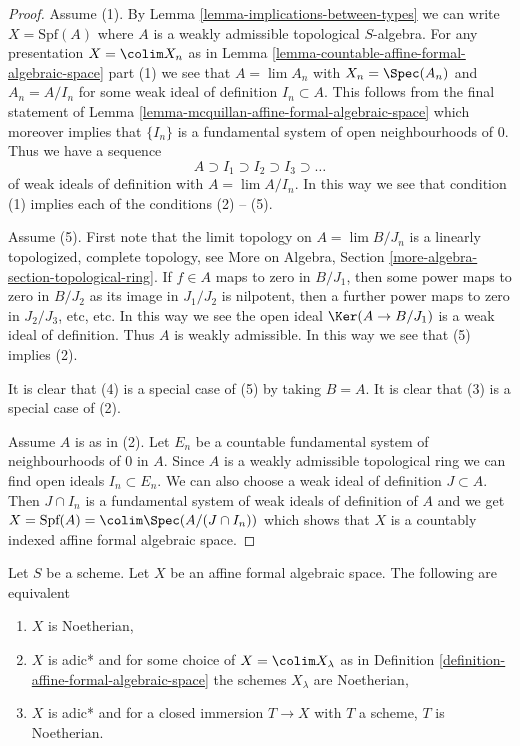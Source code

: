 \begin{proof}
Assume (1). By Lemma \ref{lemma-implications-between-types}
we can write $X = \text{Spf}(A)$ where $A$ is a weakly admissible
topological $S$-algebra. For any presentation $X = \colim X_n$ as in
Lemma \ref{lemma-countable-affine-formal-algebraic-space} part (1)
we see that $A = \lim A_n$ with $X_n = \Spec(A_n)$ and
$A_n = A/I_n$ for some weak ideal of definition $I_n \subset A$.
This follows from the final statement of
Lemma \ref{lemma-mcquillan-affine-formal-algebraic-space}
which moreover implies that $\{I_n\}$ is a fundamental system
of open neighbourhoods of $0$. Thus we have a sequence
$$
A \supset I_1 \supset I_2 \supset I_3 \supset \ldots
$$
of weak ideals of definition with $A = \lim A/I_n$. In this way
we see that condition (1) implies each of the conditions (2) -- (5).

\medskip\noindent
Assume (5). First note that the limit topology on
$A = \lim B/J_n$ is a linearly topologized, complete topology, see
More on Algebra, Section \ref{more-algebra-section-topological-ring}.
If $f \in A$ maps to zero in $B/J_1$, then some power maps to zero
in $B/J_2$ as its image in $J_1/J_2$ is nilpotent, then a further
power maps to zero in $J_2/J_3$, etc, etc. In this way we see
the open ideal $\Ker(A \to B/J_1)$ is a weak ideal of definition.
Thus $A$ is weakly admissible. In this way we see that (5) implies (2).

\medskip\noindent
It is clear that (4) is a special case of (5) by taking $B = A$.
It is clear that (3) is a special case of (2).

\medskip\noindent
Assume $A$ is as in (2). Let $E_n$ be a countable fundamental
system of neighbourhoods of $0$ in $A$. Since $A$ is a weakly
admissible topological ring we can find open ideals $I_n \subset E_n$.
We can also choose a weak ideal of definition $J \subset A$.
Then $J \cap I_n$ is a fundamental system of weak ideals of definition
of $A$ and we get
$X = \text{Spf}(A) = \colim \Spec(A/(J \cap I_n))$
which shows that $X$ is a countably indexed affine formal algebraic space.
\end{proof}

\begin{lemma}
\label{lemma-characterize-noetherian-affine}
Let $S$ be a scheme. Let $X$ be an affine formal algebraic space.
The following are equivalent
\begin{enumerate}
\item $X$ is Noetherian,
\item $X$ is adic* and for some choice of $X = \colim X_\lambda$ as in
Definition \ref{definition-affine-formal-algebraic-space}
the schemes $X_\lambda$ are Noetherian,
\item $X$ is adic* and for a closed immersion $T \to X$ with $T$
a scheme, $T$ is Noetherian.
\end{enumerate}
\end{lemma}

